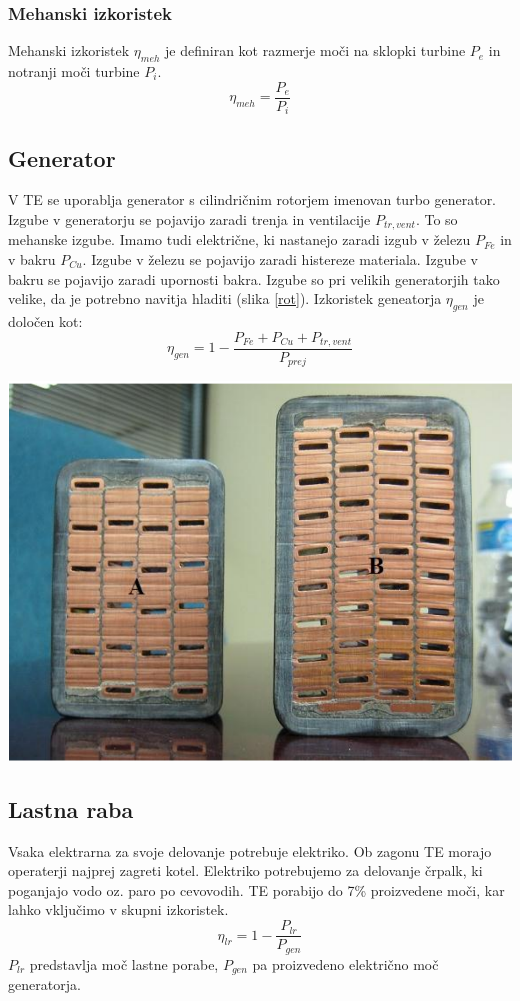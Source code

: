 \documentclass[a4paper,10pt]{article}
\begin{document}
\begin{multicols}{2}
\subsubsection{Mehanski izkoristek}
Mehanski izkoristek $\eta_{meh}$ je definiran kot razmerje moči na sklopki turbine $P_e$ in notranji moči turbine $P_i$.
\begin{equation}
	\eta_{meh}= \frac{P_e}{P_i}
\end{equation}
\subsection{Generator}
V TE se uporablja generator s cilindričnim rotorjem imenovan turbo generator. Izgube v generatorju se pojavijo zaradi trenja in ventilacije $P_{tr,vent}$. To so mehanske izgube. Imamo tudi električne, ki nastanejo zaradi izgub v železu $P_{Fe}$ in v bakru $P_{Cu}$. Izgube v železu se pojavijo zaradi histereze materiala. Izgube v bakru se pojavijo zaradi upornosti bakra. Izgube so pri velikih generatorjih tako velike, da je potrebno navitja hladiti (slika \ref{rot}). Izkoristek geneatorja  $\eta_{gen}$ je določen kot:
\begin{equation}
	\eta_{gen}=1- \frac{P_{Fe}+P_{Cu}+P_{tr,vent}}{P_{prej}}
\end{equation}
\begin{minipage}{\linewidth}
	\includegraphics[width=0.95\columnwidth]{rotor.png}
	\label{rot}
\end{minipage}
\subsection{Lastna raba}
Vsaka elektrarna za svoje delovanje potrebuje elektriko. Ob zagonu TE morajo operaterji najprej zagreti kotel. Elektriko potrebujemo za delovanje črpalk, ki poganjajo vodo oz. paro po cevovodih. TE porabijo do 7\% proizvedene moči, kar lahko vključimo v skupni izkoristek. \citep{Tuma}
\begin{equation}
	\eta_{lr}=1-\frac{P_{lr}}{P_{gen}}
\end{equation}
$P_{lr}$ predstavlja moč lastne porabe, $P_{gen}$ pa proizvedeno električno moč generatorja.

\end{multicols}
\end{document}
